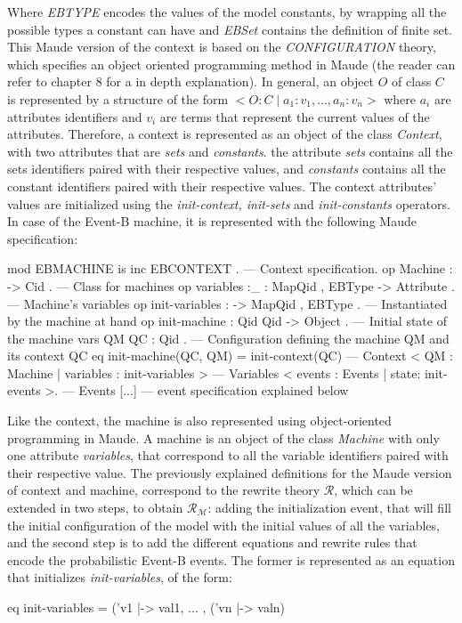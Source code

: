 Where \textit{EBTYPE} encodes the values of the model constants, by wrapping all the possible types a constant can have and \textit{EBSet} contains the definition of finite set. This Maude version of the context is based on the \textit{CONFIGURATION} theory, which specifies an object oriented programming method in Maude (the reader can refer to \cite{MaudeManual} chapter 8 for a in depth explanation). In general, an object $O$ of class $C$ is represented by a structure of the form $<O:C \; | \; a_1 : v_1 , ... , a_n:v_n>$ where $a_i$ are attributes identifiers and $v_i$ are terms that represent the current values of the attributes. Therefore, a context is represented as an object of the class \textit{Context}, with two attributes that are \textit{sets} and \textit{constants}. the attribute \textit{sets} contains all the sets identifiers paired with their respective values, and  \textit{constants} contains all the constant identifiers paired with their respective values. The context attributes' values are initialized using the \textit{init-context, init-sets} and \textit{init-constants} operators. In case of the Event-B machine, it is represented with the following Maude specification:
\\
\begin{maude}
mod EBMACHINE is
  inc EBCONTEXT  . --- Context specification. 
  op Machine  : -> Cid . --- Class for machines
  op variables :_ : Map{Qid , EBType} -> Attribute . --- Machine's variables 
  op init-variables : ->  Map{Qid , EBType} . --- Instantiated by the machine at hand
  op init-machine : Qid Qid -> Object . --- Initial state of the machine
  vars QM QC : Qid .
  --- Configuration defining the machine QM and its context QC
  eq init-machine(QC, QM)  = 
                  init-context(QC)                              --- Context 
                  < QM : Machine | variables : init-variables > --- Variables
                  < events : Events | state: init-events >.     --- Events 
[...] --- event specification explained below
\end{maude}
Like the context, the machine is also represented using object-oriented programming in Maude. A machine is an object of the class \textit{Machine} with only one attribute \textit{variables}, that correspond to all the variable identifiers paired with their respective value. The previously explained definitions for the Maude version of context and machine, correspond to the rewrite theory $\mathscr{R}$, which can be extended in two steps, to obtain $\mathscr{R}_\mathscr{M}$: adding the initialization event, that will fill the initial configuration of the model with the initial values of all the variables, and the second step is to add the different equations and rewrite rules that encode the probabilistic Event-B events. The former is represented as an equation that initializes \textit{init-variables}, of the form:
\\
\begin{maude}
    eq init-variables = ('v1 |-> val1, ... , ('vn   |-> valn)
\end{maude}

